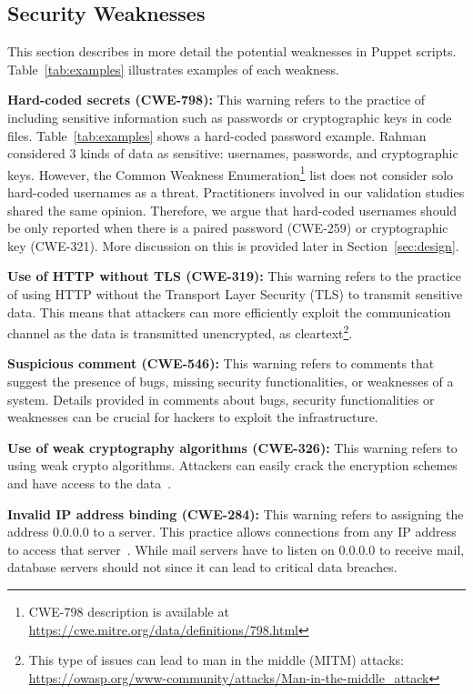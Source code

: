 \subsection{Security Weaknesses}

This section describes in more detail the potential weaknesses 
in Puppet scripts. Table~\ref{tab:examples} illustrates 
examples of each weakness.

\textbf{Hard-coded secrets (CWE-798):} This warning refers to the practice of
including sensitive information such as passwords or cryptographic keys in
code files. Table~\ref{tab:examples} shows a hard-coded 
password example.
Rahman \etal{} considered $3$ kinds of data as
sensitive: usernames, passwords, and cryptographic keys. 
However,
the Common Weakness Enumeration\footnote{CWE-798 description is available at \url{https://cwe.mitre.org/data/definitions/798.html}}
list does not consider solo hard-coded usernames as a threat.
Practitioners
involved in our validation studies shared the same opinion. Therefore,
we argue that hard-coded usernames should be only reported
when there is a paired password (CWE-259) or cryptographic key (CWE-321).
More discussion on this is provided later in Section~\ref{sec:design}.


\textbf{Use of HTTP without TLS (CWE-319):} This warning refers to the practice
of using HTTP without the Transport Layer Security (TLS) to transmit
sensitive data. This means that attackers can more efficiently exploit the
communication channel as the data is transmitted unencrypted, as
cleartext\footnote{This type of issues can lead to man in the middle (MITM) attacks: \url{https://owasp.org/www-community/attacks/Man-in-the-middle_attack}}.

\textbf{Suspicious comment (CWE-546):} This warning refers to
 comments that suggest the presence of bugs, missing security functionalities,
or weaknesses of a system. Details provided in comments about bugs, security functionalities
or weaknesses can be crucial for hackers to exploit the infrastructure.

\textbf{Use of weak cryptography algorithms (CWE-326):} This warning refers to
using weak crypto algorithms.
Attackers can easily crack the encryption schemes and have
access to the data~\cite{10.1007/11426639_2}.

\textbf{Invalid IP address binding (CWE-284):} This warning refers to
assigning the address 0.0.0.0 to a server.
This practice allows connections from any IP address to access 
that server~\cite{DBLP:conf/raid/Mutaf99}.
While mail servers have to listen on 0.0.0.0 to receive
mail, database servers should not since it can lead
to critical data breaches.


